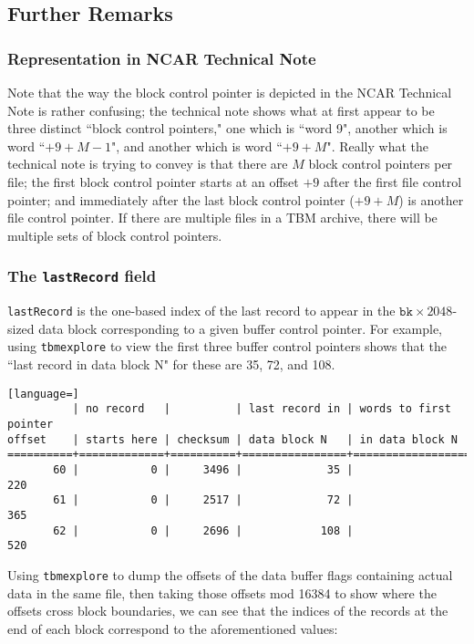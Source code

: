 \documentclass{report}
\begin{document}
\subsection{Further Remarks}

\subsubsection{Representation in NCAR Technical Note}

Note that the way the block control pointer is depicted in the NCAR Technical Note is rather confusing; the technical note shows what at first appear to be three distinct ``block control pointers," one which is ``word 9", another which is word ``\(+9+M-1\)", and another which is word ``\(+9+M\)". Really what the technical note is trying to convey is that there are \(M\) block control pointers per file; the first block control pointer starts at an offset \(+9\) after the first file control pointer; and immediately after the last block control pointer (\(+9+M\)) is another file control pointer. If there are multiple files in a TBM archive, there will be multiple sets of block control pointers.

\subsubsection{The \texttt{lastRecord} field}

\texttt{lastRecord} is the one-based index of the last record to appear in the \(\mathtt{bk} \times 2048\)-sized data block corresponding to a given buffer control pointer. For example, using \texttt{tbmexplore} to view the first three buffer control pointers shows that the ``last record in data block N" for these are 35, 72, and 108.

\begin{lstlisting}[language=]
          | no record   |          | last record in | words to first pointer
offset    | starts here | checksum | data block N   | in data block N
==========+=============+==========+================+========================
       60 |           0 |     3496 |             35 |                    220
       61 |           0 |     2517 |             72 |                    365
       62 |           0 |     2696 |            108 |                    520

\end{lstlisting}

Using \texttt{tbmexplore} to dump the offsets of the data buffer flags containing actual data in the same file, then taking those offsets mod 16384 to show where the offsets cross block boundaries, we can see that the indices of the records at the end of each block correspond to the aforementioned values:
\end{document}
